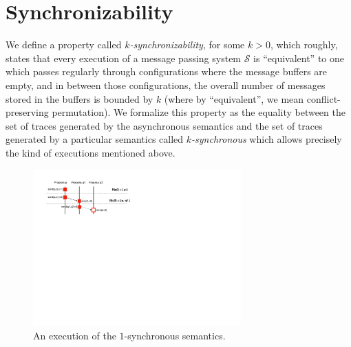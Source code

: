 \section{Synchronizability}\label{sec:criterion}

We define a property called \emph{$k$-synchronizability}, for some $k>0$, which roughly, states that every execution of a message passing system $\mathcal{S}$ is ``equivalent'' to one which passes regularly through configurations where the message buffers are empty, and in between those configurations, the overall number of messages stored in the buffers is bounded by $k$ (where by ``equivalent'', we mean conflict-preserving permutation). We formalize this property as the equality between the set of traces generated by the asynchronous semantics and the set of traces generated by a particular semantics called \emph{$k$-synchronous} which allows precisely the kind of executions mentioned above.

\begin{figure}[t]
\includegraphics[width=8cm]{ex-blocking.pdf}
\caption{An execution of the $1$-synchronous semantics.}
\label{fig:ex-blocking}
\end{figure}


